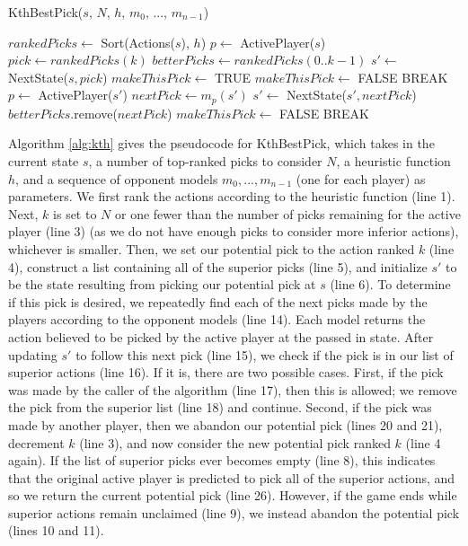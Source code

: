 \documentclass[letterpaper]{article}
\numberwithin{equation}{section}
\numberwithin{theorem}{section}
\numberwithin{lemma}{section}
\numberwithin{df}{section}
\begin{document}
\begin{algorithm}[t]
	\caption{KthBestPick($s$, $N$, $h$, $m_0$, ..., $m_{n-1}$)}
	\label{alg:kth}
	\begin{footnotesize}
	\begin{algorithmic}[1]
		\STATE $rankedPicks \gets $ Sort(Actions($s$), $h$)
		\STATE $p \gets $ ActivePlayer($s$)
			\STATE $pick \gets rankedPicks(k)$
			\STATE $betterPicks \gets rankedPicks(0..k-1)$
			\STATE $s' \gets $ NextState($s, pick$)
			\STATE $makeThisPick \gets $ TRUE
					\STATE $makeThisPick \gets $ FALSE
					\STATE BREAK
				\ENDIF
				\STATE $p \gets $ ActivePlayer($s'$)
				\STATE $nextPick \gets m_p(s')$
				\STATE $s' \gets $ NextState($s', nextPick$)
						\STATE $betterPicks.$remove($nextPick$)
					\ELSE
						\STATE $makeThisPick \gets $ FALSE
						\STATE BREAK
					\ENDIF
				\ENDIF
			\ENDWHILE
			\ENDIF
		\ENDFOR
	\end{algorithmic}
	\end{footnotesize}
\end{algorithm}

Algorithm \ref{alg:kth} gives the pseudocode for KthBestPick, which takes in the current state $s$, a number of top-ranked picks to consider $N$, a heuristic function $h$, and a sequence of opponent models $m_0, ..., m_{n-1}$ (one for each player) as parameters.  We first rank the actions according to the heuristic function (line 1).  Next, $k$ is set to $N$ or one fewer than the number of picks remaining for the active player (line 3) (as we do not have enough picks to consider more inferior actions), whichever is smaller.  Then, we set our potential pick to the action ranked $k$ (line 4), construct a list containing all of the superior picks (line 5), and initialize $s'$ to be the state resulting from picking our potential pick at $s$ (line 6).  To determine if this pick is desired, we repeatedly find each of the next picks made by the players according to the opponent models (line 14).  Each model returns the action believed to be picked by the active player at the passed in state.  After updating $s'$ to follow this next pick (line 15), we check if the pick is in our list of superior actions (line 16).  If it is, there are two possible cases.  First, if the pick was made by the caller of the algorithm (line 17), then this is allowed; we remove the pick from the superior list (line 18) and continue.  Second, if the pick was made by another player, then we abandon our potential pick (lines 20 and 21), decrement $k$ (line 3), and now consider the new potential pick ranked $k$ (line 4 again).  If the list of superior picks ever becomes empty (line 8), this indicates that the original active player is predicted to pick all of the superior actions, and so we return the current potential pick (line 26).  However, if the game ends while superior actions remain unclaimed (line 9), we instead abandon the potential pick (lines 10 and 11). 
\end{document}
